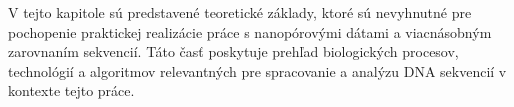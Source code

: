 V tejto kapitole sú predstavené teoretické základy, ktoré sú nevyhnutné pre pochopenie praktickej realizácie práce s nanopórovými dátami a viacnásobným zarovnaním sekvencií. Táto časť poskytuje prehľad biologických procesov, technológií a algoritmov relevantných pre spracovanie a analýzu DNA sekvencií v kontexte tejto práce.




% 
